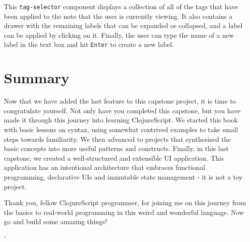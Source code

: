 \documentclass[10pt,twoside,openright]{memoir}
\begin{document}
This \texttt{tag-selector} component displays a collection of all of the
tags that have been applied to the note that the user is currently
viewing. It also contains a drawer with the remaining labels that can be
expanded or collapsed, and a label can be applied by clicking on it.
Finally, the user can type the name of a new label in the text box and
hit \texttt{Enter} to create a new label.

\section{Summary}

Now that we have added the last feature to this capstone project, it is
time to congratulate yourself. Not only have you completed this
capstone, but you have made it through this journey into learning
ClojureScript. We started this book with basic lessons on syntax, using
somewhat contrived examples to take small steps towards familiarity. We
then advanced to projects that synthesized the basic concepts into more
useful patterns and constructs. Finally, in this last capstone, we
created a well-structured and extensible UI application. This
application has an intentional architecture that embraces functional
programming, declarative UIs and immutable state management - it is not
a toy project.

Thank you, fellow ClojureScript programmer, for joining me on this
journey from the basics to real-world programming in this weird and
wonderful language. Now go and build some amazing things!

\cleardoublepage

\printindex`
\end{document}
